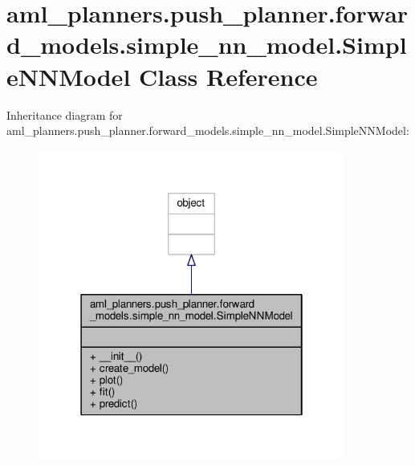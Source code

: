 \hypertarget{classaml__planners_1_1push__planner_1_1forward__models_1_1simple__nn__model_1_1_simple_n_n_model}{\section{aml\-\_\-planners.\-push\-\_\-planner.\-forward\-\_\-models.\-simple\-\_\-nn\-\_\-model.\-Simple\-N\-N\-Model Class Reference}
\label{classaml__planners_1_1push__planner_1_1forward__models_1_1simple__nn__model_1_1_simple_n_n_model}
}


Inheritance diagram for aml\-\_\-planners.\-push\-\_\-planner.\-forward\-\_\-models.\-simple\-\_\-nn\-\_\-model.\-Simple\-N\-N\-Model\-:\nopagebreak
\begin{figure}[H]
\begin{center}
\leavevmode
\includegraphics[width=286pt]{classaml__planners_1_1push__planner_1_1forward__models_1_1simple__nn__model_1_1_simple_n_n_model__inherit__graph}
\end{center}
\end{figure}


